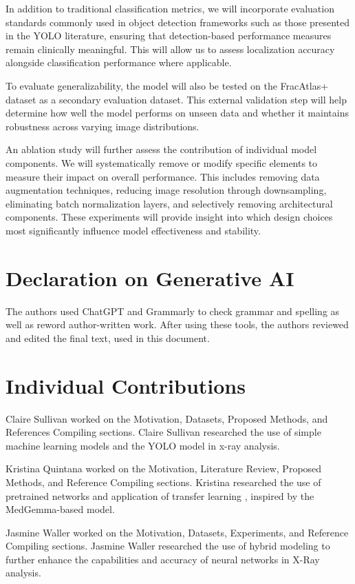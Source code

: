 \documentclass[conference]{IEEEtran}
\begin{document}
In addition to traditional classification metrics, we will incorporate evaluation standards commonly used in object detection frameworks such as those presented in the YOLO literature, ensuring that detection-based performance measures remain clinically meaningful. This will allow us to assess localization accuracy alongside classification performance where applicable.

To evaluate generalizability, the model will also be tested on the FracAtlas+ dataset as a secondary evaluation dataset. This external validation step will help determine how well the model performs on unseen data and whether it maintains robustness across varying image distributions.

An ablation study will further assess the contribution of individual model components. We will systematically remove or modify specific elements to measure their impact on overall performance. This includes removing data augmentation techniques, reducing image resolution through downsampling, eliminating batch normalization layers, and selectively removing architectural components. These experiments will provide insight into which design choices most significantly influence model effectiveness and stability.


\section{Declaration on Generative AI}
The authors used ChatGPT and Grammarly to check grammar and spelling as well as reword author-written work. After using these tools, the authors reviewed and edited the final text, used in this document. 

\section{Individual Contributions}
Claire Sullivan worked on the Motivation, Datasets, Proposed Methods, and References Compiling sections. Claire Sullivan researched the use of simple machine learning models and the YOLO model in x-ray analysis.  

Kristina Quintana worked on the Motivation, Literature Review, Proposed Methods, and Reference Compiling sections. Kristina researched the use of pretrained networks and application of transfer learning , inspired by the MedGemma-based model.

Jasmine Waller worked on the Motivation, Datasets, Experiments, and Reference Compiling sections. Jasmine Waller researched the use of hybrid modeling to further enhance the capabilities and accuracy of neural networks in X-Ray analysis.

  
         

\end{document}
